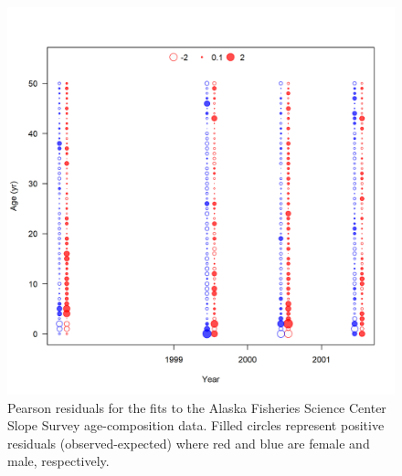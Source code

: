 \documentclass[11pt,
  english,
  a4paper,
]{article}
\begin{document}
\tagmcend\tagstructend


\begin{figure}
\centering
\includegraphics[width=1\textwidth,height=1\textheight]{figs/comp_agefit_residsflt6mkt0.png}
\caption{Pearson residuals for the fits to the Alaska Fisheries Science Center Slope Survey age-composition data. Filled circles represent positive residuals (observed-expected) where red and blue are female and male, respectively. \label{fig:acomp_resid_6}}
\end{figure}

\tagmcend\tagstructend

\end{document}
